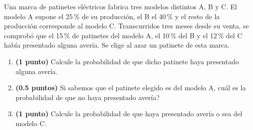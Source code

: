 
Una marca de patinetes eléctricos fabrica tres modelos distintos A, B y C.
El modelo A supone el 25\,\% de su producción, el B el 40\,\% y el resto
de la producción corresponde al modelo C. Transcurridos tres meses desde
su venta, se comprobó que el 15\,\% de patinetes del modelo A, el 10\,\%
del B y el 12\,\% del C había presentado alguna avería. Se elige al azar
un patinete de esta marca.

\begin{enumerate}[label=\alph*)]
  \item \textbf{(1 punto)} Calcule la probabilidad de que dicho patinete haya
  presentado alguna avería.
  \item \textbf{(0.5 puntos)} Si sabemos que el patinete elegido es del
  modelo A, \textquestiondown{}cuál es la probabilidad de que no haya
  presentado avería?
  \item \textbf{(1 punto)} Calcule la probabilidad de que haya presentado
  avería o sea del modelo C.
\end{enumerate}
